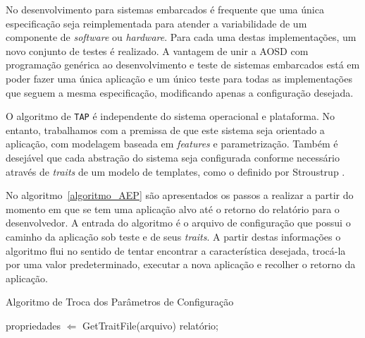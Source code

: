 \documentclass[conference]{IEEEtran}
\begin{document}
No desenvolvimento para sistemas embarcados é frequente que uma única especificação seja reimplementada para atender a variabilidade de um componente de \textit{software} ou \textit{hardware}. Para cada uma destas implementações, um novo conjunto de testes é realizado. A vantagem de unir a AOSD com programação genérica ao desenvolvimento e teste de sistemas embarcados está em poder fazer uma única aplicação e um único teste para todas as implementações que seguem a mesma especificação, modificando apenas a configuração desejada.

O algoritmo de \texttt{TAP} é independente do sistema operacional e plataforma. No entanto, trabalhamos com a premissa de que este sistema seja orientado a aplicação, com modelagem baseada em \textit{features} e parametrização. Também é desejável que cada abstração do sistema seja configurada conforme necessário através de \textit{traits} de um modelo de templates, como o definido por Stroustrup \cite{Stroustrup:c++}. 

No algoritmo~\ref{algoritmo_AEP} são apresentados os passos a realizar a partir do momento em que se tem uma aplicação alvo até o retorno do relatório para o desenvolvedor. A entrada do algoritmo é o arquivo de configuração que possui o caminho da aplicação sob teste e de seus \textit{traits}. A partir destas informações o algoritmo flui no sentido de tentar encontrar a característica desejada, trocá-la por uma valor predeterminado, executar a nova aplicação e recolher o retorno da aplicação.


\begin{algorithm}
\caption{Algoritmo de Troca dos Parâmetros de Configuração}\label{algoritmo_AEP}
propriedades $\Leftarrow$ GetTraitFile(arquivo)\;
\Return relat\'{o}rio;
\end{algorithm}
\end{document}
